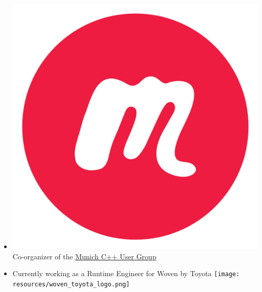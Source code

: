 \documentclass[aspectratio=169]{beamer}
\begin{document}
\begin{frame}[fragile]
\begin{itemize}
    \item \includegraphics[height=.05\textheight]{resources/meetup-icon.png} Co-organizer of the \href{https://www.meetup.com/MUCplusplus/}{Munich C++ User Group}

    \item Currently working as a Runtime Engineer for Woven by Toyota \texttt{[image: resources/woven\_toyota\_logo.png]}

  \end{itemize}
\end{frame}
\end{document}
